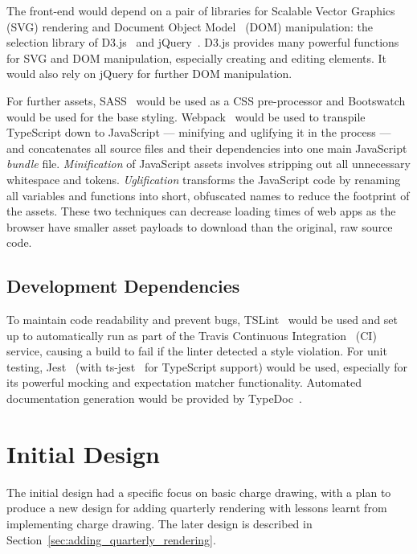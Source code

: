 \documentclass[nobib, a4paper, twoside, justified]{tufte-book}
\begin{document}
The front-end would depend on a pair of libraries for Scalable Vector
Graphics~\autocite{ferraiolo2000scalable} (SVG) rendering and Document Object
Model~\autocite{wood2004document} (DOM) manipulation: the selection library of
D3.js~\autocite{d3js} and jQuery~\autocite{jquery}. D3.js provides many powerful functions for SVG
and DOM manipulation, especially creating and editing elements. It would also rely on jQuery for
further DOM manipulation.

For further assets, SASS~\autocite{sass-lang} would be used as a CSS pre-processor and
Bootswatch~\autocite{bootswatch-flatly} would be used for the base styling.
Webpack~\autocite{webpack} would be used to transpile TypeScript down to JavaScript --- minifying
and uglifying it in the process --- and concatenates all source files and their dependencies into
one main JavaScript \textit{bundle} file. \textit{Minification} of JavaScript assets involves
stripping out all unnecessary whitespace and tokens.  \textit{Uglification} transforms the
JavaScript code by renaming all variables and functions into short, obfuscated names to reduce the
footprint of the assets. These two techniques can decrease loading times of web apps as the browser
have smaller asset payloads to download than the original, raw source code.

\subsection{Development Dependencies}%
\label{sub:development_dependencies}

To maintain code readability and prevent bugs, TSLint~\autocite{tslint} would be used and set up to
automatically run as part of the Travis Continuous Integration~\autocite{travis} (CI) service,
causing a build to fail if the linter detected a style violation. For unit testing,
Jest~\autocite{jest} (with ts-jest~\autocite{ts-jest} for TypeScript support) would be used,
especially for its powerful mocking and expectation matcher functionality. Automated documentation
generation would be provided by TypeDoc~\autocite{typedoc}.

\section{Initial Design}%
\label{sec:initial_design}

The initial design had a specific focus on basic charge drawing, with a plan to produce a new
design for adding quarterly rendering with lessons learnt from implementing charge drawing. The
later design is described in Section~\ref{sec:adding_quarterly_rendering}.
\end{document}
